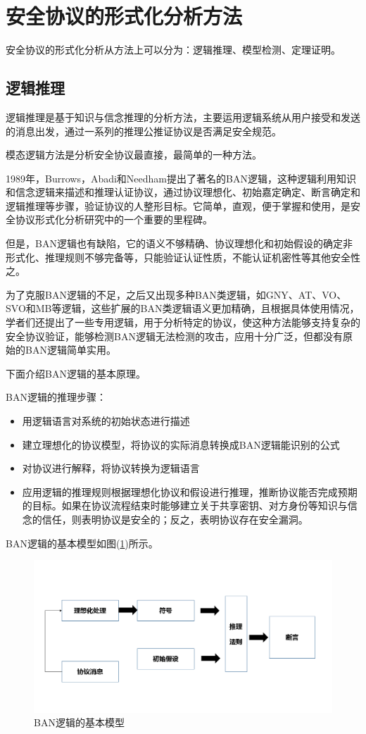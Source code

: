 \documentclass[cs4size,a4pape,UTF8]{ctexart}
\numberwithin{equation}{section}
\numberwithin{table}{section}
\numberwithin{figure}{section}
\begin{document}
\newpage
\section{安全协议的形式化分析方法}
安全协议的形式化分析从方法上可以分为：逻辑推理、模型检测、定理证明。

\subsection{逻辑推理}
逻辑推理是基于知识与信念推理的分析方法，主要运用逻辑系统从用户接受和发送的消息出发，通过一系列的推理公推证协议是否满足安全规范。

模态逻辑方法是分析安全协议最直接，最简单的一种方法。

1989年，Burrows，Abadi和Needham提出了著名的BAN逻辑，这种逻辑利用知识和信念逻辑来描述和推理认证协议，通过协议理想化、初始嘉定确定、断言确定和逻辑推理等步骤，验证协议的人整形目标。它简单，直观，便于掌握和使用，是安全协议形式化分析研究中的一个重要的里程碑。

但是，BAN逻辑也有缺陷，它的语义不够精确、协议理想化和初始假设的确定非形式化、推理规则不够完备等，只能验证认证性质，不能认证机密性等其他安全性之。

为了克服BAN逻辑的不足，之后又出现多种BAN类逻辑，如GNY、AT、VO、SVO和MB等逻辑，这些扩展的BAN类逻辑语义更加精确，且根据具体使用情况，学者们还提出了一些专用逻辑，用于分析特定的协议，使这种方法能够支持复杂的安全协议验证，能够检测BAN逻辑无法检测的攻击，应用十分广泛，但都没有原始的BAN逻辑简单实用。

下面介绍BAN逻辑的基本原理。

BAN逻辑的推理步骤： 
\begin{itemize}
\item 用逻辑语言对系统的初始状态进行描述
\item 建立理想化的协议模型，将协议的实际消息转换成BAN逻辑能识别的公式
\item 对协议进行解释，将协议转换为逻辑语言
\item 应用逻辑的推理规则根据理想化协议和假设进行推理，推断协议能否完成预期的目标。如果在协议流程结束时能够建立关于共享密钥、对方身份等知识与信念的信任，则表明协议是安全的；反之，表明协议存在安全漏洞。
\end{itemize}

BAN逻辑的基本模型如图(\ref{fig:3})所示。

\begin{figure}[h!]
\centering
\includegraphics[width=0.6\linewidth]{figure/3}
\caption{BAN逻辑的基本模型}
\label{fig:3}
\end{figure}
\end{document}
